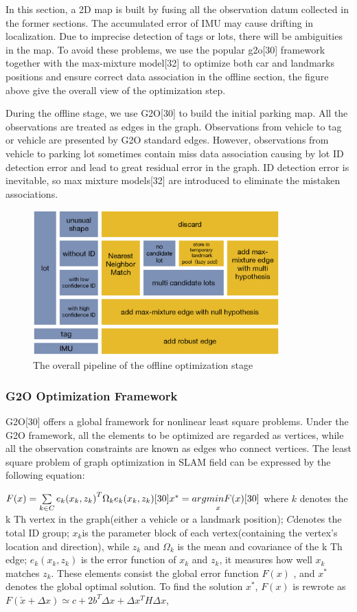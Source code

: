 \documentclass[journal]{IEEEtran}
\begin{document}
In this section, a 2D map is built by fusing all the observation datum collected in the former sections. The accumulated error of IMU may cause drifting in localization. Due to imprecise detection of tags or lots, there will be ambiguities in the map. To avoid these problems, we use the popular g2o[30] framework together with the max-mixture model[32] to optimize both car and landmarks positions and ensure correct data association in the offline section, the figure above give the overall view of the optimization step.

During the offline stage, we use G2O[30] to build the initial parking map. All the observations are treated as edges in the graph. Observations from vehicle to tag or vehicle are presented by G2O standard edges. However, observations from vehicle to parking lot sometimes contain miss data association causing by lot ID detection error and lead to great residual error in the graph. ID detection error is inevitable, so max mixture models[32] are introduced to eliminate the mistaken associations.

\begin{figure}
\centering
\includegraphics[height = 2.2in]{fig8_Optimize}
\caption{
The overall pipeline of the offline optimization stage
}\label{fig:8}
\end{figure}

\subsubsection{G2O Optimization Framework}
G2O[30] offers a global framework for nonlinear least square problems. Under the G2O framework, all the elements to be optimized are regarded as vertices, while all the observation constraints are known as edges who connect vertices. The least square problem of graph optimization in SLAM field can be expressed by the following equation:

$F(x)=\sum\limits_{k \in C}e_k{(x_k,z_k)}^T{\Omega}_k e_k(x_k,z_k)[30]\\
x^{*} = \mathop{argminF(x)}\limits_x[30]\\$
where $k$ denotes the k Th vertex in the graph(either a vehicle or a landmark position);  $C$denotes the total ID group; $x_k$is the parameter block of each vertex(containing the vertex’s location and direction), while $z_k$ and $\Omega_k$ is the mean and covariance of the k Th edge; $e_k(x_k,z_k)$ is the error function of $x_k$ and $z_k$, it measures how well $x_k$ matches $z_k$. These elements consist the global error function $F(x)$ , and $x^*$ denotes the global optimal solution.
To find the solution $x^*$, $F(x)$ is rewrote as $F(\check{x}+\Delta x)\simeq c+2b^T \Delta x + \Delta x^T H \Delta x$, %
\end{document}
